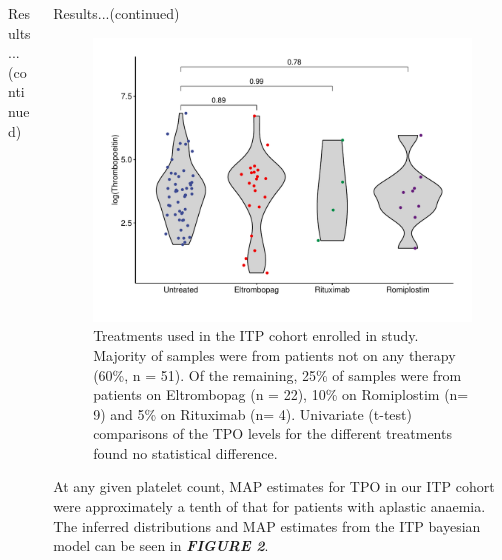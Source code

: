 \documentclass[landscape,a0paper,fontscale=0.285]{beamer} %
\newlength{\onecolwid}
\newlength{\twocolwid}
\begin{document}
\begin{frame}[t]
\begin{columns}[t]
\begin{column}{\twocolwid}
\begin{columns}[t,totalwidth=\twocolwid]
\begin{column}{\onecolwid}
\begin{block}{Results...(continued)}
\end{block}



\end{column} %

\begin{column}{\onecolwid} %

\begin{block}{Results...(continued)}
\begin{figure}[H]
\includegraphics[width=1\linewidth]{fig/Static_diff_itp_only.pdf}
\caption{Treatments used in the ITP cohort enrolled in study. Majority of samples were from patients not on any therapy (60\%, n = 51). Of the remaining, 25\% of samples were from patients on Eltrombopag (n = 22), 10\% on Romiplostim (n= 9) and 5\% on Rituximab (n= 4). Univariate (t-test) comparisons of the TPO levels for the different treatments found no statistical difference.} 
\end{figure}

At any given platelet count, MAP estimates for TPO in our ITP cohort were approximately a tenth of that for patients with aplastic anaemia. The inferred distributions and MAP estimates from the ITP bayesian model can be seen in \textbf{\emph{FIGURE 2}}.



\end{block}
\end{column}
\end{columns}
\end{column}
\end{columns}
\end{frame}
\end{document}
